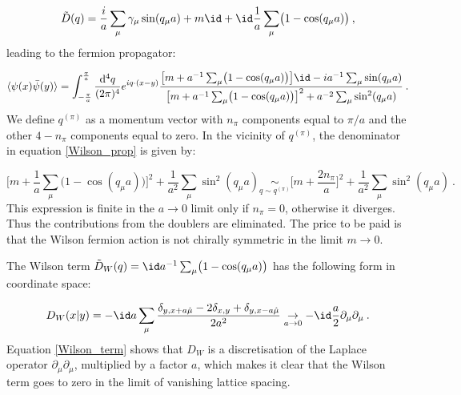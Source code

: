 \begin{equation}
\tilde D(q) = \frac{i}{a} \sum_{\mu} \gamma_{\mu} \sin (q_{\mu} a) + m \id + \id \frac{1}{a} \sum_{\mu} \bigl( 1 - \cos(q_{\mu}a) \bigr) \: , 
\end{equation}
%
leading to the fermion propagator:

\begin{equation}
\langle \psi(x) \bar \psi(y) \rangle = \int_{-\frac{\pi}{a}}^{\frac{\pi}{a}} \frac{\mathrm{d}^4 q}{(2 \pi)^4} e^{iq\cdot (x-y)}  \frac{\bigl[ m + a^{-1} \sum_{\mu}\bigl( 1 - \cos(q_{\mu}a) \bigr)\bigr] \id                                                                           - i a^{-1} \sum_{\mu} \sin(q_{\mu}a)}{\bigl[m + a^{-1}\sum_{\mu} \bigl(1 - \cos(q_{\mu}a) \bigr) \bigr]^2  + a^{-2}\sum_{\mu} \sin^2(q_{\mu}a) } \: .
\label{Wilson_prop}
\end{equation}
%
We define $q^{(\pi)}$ as a momentum vector with $n_{\pi}$ components equal to $\pi/a$ and the other $4-n_{\pi}$ components equal to zero.
In the vicinity of $q^{(\pi)}$, the denominator in equation \ref{Wilson_prop} is given by:

\begin{equation}
\biggl[m + \frac{1}{a}\sum_{\mu} \bigl(1 - \cos(q_{\mu}a) \bigr) \biggr]^2  + \frac{1}{a^2}\sum_{\mu} \sin^2(q_{\mu}a) \underset{q \sim q^{(\pi)}}{\sim}
\biggl[m + \frac{2 n_{\pi}}{a} \biggr]^2  +\frac{1}{a^2}\sum_{\mu} \sin^2(q_{\mu}a) \: .
\end{equation}
%
This expression is finite in the $a \to 0$ limit only if $n_{\pi} = 0$, otherwise it diverges. Thus the contributions from the doublers are eliminated. The price to be paid is that the Wilson fermion action is not chirally symmetric in the limit $m \to 0$. 



The Wilson term $\tilde D_W (q) = \id a^{-1} \sum_{\mu}\bigl( 1 - \cos(q_{\mu}a) \bigr)$ has the following  form in coordinate space:

\begin{equation}
D_W(x \vert y) = -\id  a \sum_{\mu} \frac{\delta_{y,x+a\hat\mu} -2 \delta_{x,y} + \delta_{y,x-a\hat\mu}}{2a^2} \underset{a \to 0} \to - \id\frac{a}{2} \partial_{\mu}\partial_{\mu} \: .
\label{Wilson_term}
\end{equation}
%
Equation \ref{Wilson_term} shows that $D_W$ is a discretisation of the Laplace operator $\partial_{\mu}\partial_{\mu}$, multiplied by a factor $a$, which makes it clear that the Wilson term goes to zero in the limit of vanishing lattice spacing.


